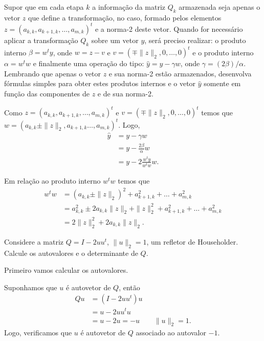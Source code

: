 \begin{questions}
    \question Supor que em cada etapa $k$ a informa\c{c}\~{a}o da matriz $Q_k$ armazenada seja apenas o vetor $z$ que define a transforma\c{c}\~{a}o, no caso, formado pelos elementos $z = \left( a_{k, k}, a_{k + 1, k}, \ldots, a_{m, k} \right)^t$ e a norma-2 deste vetor. Quando for necess\'{a}rio aplicar a transforma\c{c}\~{a}o $Q_k$ sobre um vetor $y$, ser\'{a} preciso realizar: o produto interno $\beta = w^t y$, onde $w = z - v$ e $v = \left( \mp \| z \|_2, 0, \ldots, 0 \right)^t$ e o produto interno $\alpha = w^t w$ e finalmente uma opera\c{c}\~{a}o do tipo: $\hat{y} = y - \gamma w$, onde $\gamma = \left( 2 \beta \right) / \alpha$. Lembrando que apenas o vetor $z$ e sua norma-2 est\~{a}o armazenados, desenvolva f\'{o}rmulas simples para obter estes produtos internos e o vetor $\hat{y}$ somente em fun\c{c}\~{a}o das componentes de $z$ e de sua norma-2.
    \begin{solution}
        Como $z = \left( a_{k, k}, a_{k + 1, k}, \ldots, a_{m, k} \right)^t$ e $v = \left( \mp \| z \|_2, 0, \ldots, 0 \right)^t$ temos que $w = \left( a_{k, k} \pm \| z \|_2, a_{k + 1, k} \ldots, a_{m, k}  \right)^t$. Logo,
        \begin{align*}
            \hat{y} &= y - \gamma w \\
            &= y - \frac{2 \beta}{\alpha} w \\
            &= y - 2 \frac{w^t y}{w^t w} w.
        \end{align*}

        Em rela\c{c}\~{a}o ao produto interno $w^t w$ temos que
        \begin{align*}
            w^t w &= \left( a_{k, k} \pm \| z \|_2 \right)^2 + a_{k + 1, k}^2 + \ldots + a_{m, k}^2 \\
            &= a_{k, k}^2 \pm 2 a_{k, k} \| z \|_2 + \| z \|_2^2 + a_{k + 1, k}^2 + \ldots + a_{m, k}^2 \\
            &= 2 \| z \|_2^2 + 2 a_{k, k} \| z \|_2.
        \end{align*}
    \end{solution}

    \question Considere a matriz $Q = I - 2 u u^t$, $\| u \|_2 = 1$, um refletor de Householder. Calcule os autovalores e o determinante de $Q$.
    \begin{solution}
       Primeiro vamos calcular os autovalores.

       Suponhamos que $u$ \'{e} autovetor de $Q$, ent\~{a}o
       \begin{align*}
           Q u &= \left( I - 2 u u^t \right) u \\
           &= u - 2 u u^t u \\
           &= u - 2 u = -u && \| u \|_2 = 1.
       \end{align*}
       Logo, verificamos que $u$ \'{e} autovetor de $Q$ associado ao autovalor $-1$.


\end{solution}
\end{questions}

